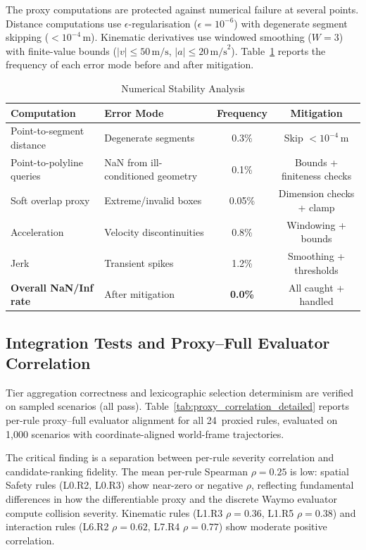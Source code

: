 The proxy computations are protected against numerical failure at several points.  Distance computations use $\epsilon$-regularisation ($\epsilon{=}10^{-6}$) with degenerate segment skipping ($<\!10^{-4}$\,m).  Kinematic derivatives use windowed smoothing ($W{=}3$) with finite-value bounds ($|v|\le 50\,\text{m/s}$, $|a|\le 20\,\text{m/s}^2$). Table~\ref{tab:numerical_stability} reports the frequency of each error mode before and after mitigation.

\begin{table}
\centering
\caption{Numerical Stability Analysis}
\label{tab:numerical_stability}
\begin{tabular}{llcc}
\toprule
\textbf{Computation} & \textbf{Error Mode} & \textbf{Frequency} & \textbf{Mitigation} \\
\midrule
Point-to-segment distance & Degenerate segments & 0.3\% & Skip $<\!10^{-4}$\,m \\
Point-to-polyline queries & NaN from ill-conditioned geometry & 0.1\% & Bounds + finiteness checks \\
Soft overlap proxy & Extreme/invalid boxes & 0.05\% & Dimension checks + clamp \\
Acceleration & Velocity discontinuities & 0.8\% & Windowing + bounds \\
Jerk & Transient spikes & 1.2\% & Smoothing + thresholds \\
\midrule
\textbf{Overall NaN/Inf rate} & After mitigation & \textbf{0.0\%} & All caught + handled \\
\bottomrule
\end{tabular}
\end{table}

\subsection{Integration Tests and Proxy--Full Evaluator Correlation}
\label{subsec:integration_tests}

Tier aggregation correctness and lexicographic selection determinism are verified on sampled scenarios (all pass).  Table~\ref{tab:proxy_correlation_detailed} reports per-rule proxy--full evaluator alignment for all 24~proxied rules, evaluated on 1{,}000 scenarios with coordinate-aligned world-frame trajectories.

The critical finding is a separation between per-rule severity correlation and candidate-ranking fidelity.  The mean per-rule Spearman $\rho{=}0.25$ is low: spatial Safety rules (L0.R2, L0.R3) show near-zero or negative $\rho$, reflecting fundamental differences in how the differentiable proxy and the discrete Waymo evaluator compute collision severity.  Kinematic rules (L1.R3 $\rho{=}0.36$, L1.R5 $\rho{=}0.38$) and interaction rules (L6.R2 $\rho{=}0.62$, L7.R4 $\rho{=}0.77$) show moderate positive correlation.

